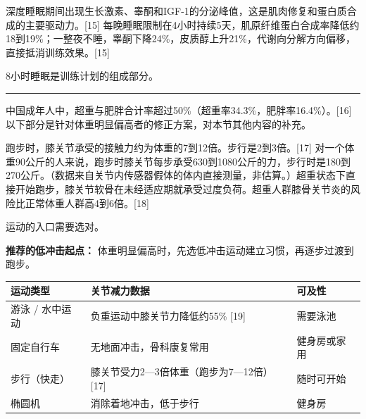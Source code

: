 \documentclass[UTF8,zihao=-4,oneside]{ctexart}
\newcommand{\BookMinorTitle}[1]{%
  \par\vspace{0.35em}{\sffamily\large\bfseries\color{TitleInk}#1}\par\vspace{0.15em}%
}
\begin{document}
\BookMinorTitle{睡眠}

深度睡眠期间出现生长激素、睾酮和IGF-1的分泌峰值，这是肌肉修复和蛋白质合成的主要驱动力。[15] 每晚睡眠限制在4小时持续5天，肌原纤维蛋白合成率降低约18到19\%；一整夜不睡，睾酮下降24\%，皮质醇上升21\%，代谢向分解方向偏移，直接抵消训练效果。[15]

8小时睡眠是训练计划的组成部分。

\vspace{0.35em}\noindent\textcolor{RuleInk}{\rule{\linewidth}{0.35pt}}\vspace{0.35em}

\BookMinorTitle{体重较重者的起步方案}

中国成年人中，超重与肥胖合计率超过50\%（超重率34.3\%，肥胖率16.4\%）。[16] 以下部分是针对体重明显偏高者的修正方案，对本节其他内容的补充。

跑步时，膝关节承受的接触力约为体重的7到12倍。步行是2到3倍。[17] 对一个体重90公斤的人来说，跑步时膝关节每步承受630到1080公斤的力，步行时是180到270公斤。（数据来自关节内传感器假体的体内直接测量，非估算。）超重状态下直接开始跑步，膝关节软骨在未经适应期就承受过度负荷。超重人群膝骨关节炎的风险比正常体重人群高4到6倍。[18]

运动的入口需要选对。

\begin{BookCallout}[colback=redBack,colframe=redLine,overlay={\node[CalloutLabel,fill=redTag] at ([xshift=3.5mm,yshift=-0.4mm]frame.north west) {注意};}]
\textbf{推荐的低冲击起点：} 体重明显偏高时，先选低冲击运动建立习惯，再逐步过渡到跑步。
\end{BookCallout}


\begin{table}[H]
\centering
\footnotesize
\renewcommand{\arraystretch}{1.18}
\begin{tabularx}{\linewidth}{@{}>{\RaggedRight\arraybackslash}X>{\RaggedRight\arraybackslash}X>{\RaggedRight\arraybackslash}X@{}}
\toprule
\textbf{运动类型} & \textbf{关节减力数据} & \textbf{可及性} \\
\midrule
游泳 / 水中运动 & 负重运动中膝关节力降低约55\% [19] & 需要泳池 \\
固定自行车 & 无地面冲击，骨科康复常用 & 健身房或家用 \\
步行（快走） & 膝关节受力2—3倍体重（跑步为7—12倍）[17] & 随时可开始 \\
椭圆机 & 消除着地冲击，低于步行 & 健身房 \\
\bottomrule
\end{tabularx}
\end{table}
\end{document}
